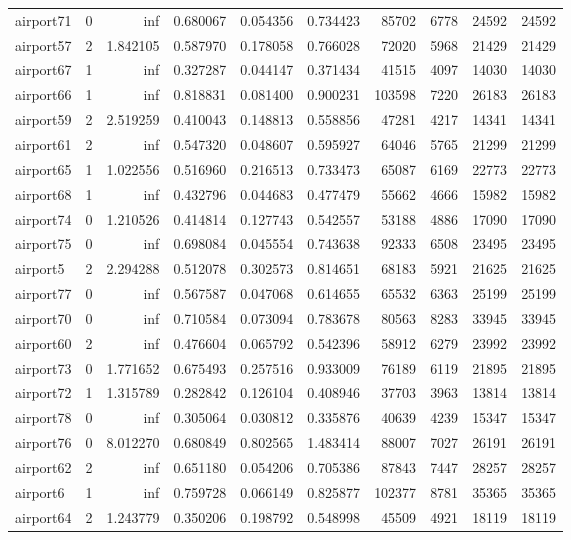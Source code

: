 \begin{longtable}{|l|r|r|r|r|r|r|r|r|r|}
airport71 & 0 & inf & 0.680067 & 0.054356 & 0.734423 & 85702 & 6778 & 24592 & 24592 \\
airport57 & 2 & 1.842105 & 0.587970 & 0.178058 & 0.766028 & 72020 & 5968 & 21429 & 21429 \\
airport67 & 1 & inf & 0.327287 & 0.044147 & 0.371434 & 41515 & 4097 & 14030 & 14030 \\
airport66 & 1 & inf & 0.818831 & 0.081400 & 0.900231 & 103598 & 7220 & 26183 & 26183 \\
airport59 & 2 & 2.519259 & 0.410043 & 0.148813 & 0.558856 & 47281 & 4217 & 14341 & 14341 \\
airport61 & 2 & inf & 0.547320 & 0.048607 & 0.595927 & 64046 & 5765 & 21299 & 21299 \\
airport65 & 1 & 1.022556 & 0.516960 & 0.216513 & 0.733473 & 65087 & 6169 & 22773 & 22773 \\
airport68 & 1 & inf & 0.432796 & 0.044683 & 0.477479 & 55662 & 4666 & 15982 & 15982 \\
airport74 & 0 & 1.210526 & 0.414814 & 0.127743 & 0.542557 & 53188 & 4886 & 17090 & 17090 \\
airport75 & 0 & inf & 0.698084 & 0.045554 & 0.743638 & 92333 & 6508 & 23495 & 23495 \\
airport5 & 2 & 2.294288 & 0.512078 & 0.302573 & 0.814651 & 68183 & 5921 & 21625 & 21625 \\
airport77 & 0 & inf & 0.567587 & 0.047068 & 0.614655 & 65532 & 6363 & 25199 & 25199 \\
airport70 & 0 & inf & 0.710584 & 0.073094 & 0.783678 & 80563 & 8283 & 33945 & 33945 \\
airport60 & 2 & inf & 0.476604 & 0.065792 & 0.542396 & 58912 & 6279 & 23992 & 23992 \\
airport73 & 0 & 1.771652 & 0.675493 & 0.257516 & 0.933009 & 76189 & 6119 & 21895 & 21895 \\
airport72 & 1 & 1.315789 & 0.282842 & 0.126104 & 0.408946 & 37703 & 3963 & 13814 & 13814 \\
airport78 & 0 & inf & 0.305064 & 0.030812 & 0.335876 & 40639 & 4239 & 15347 & 15347 \\
airport76 & 0 & 8.012270 & 0.680849 & 0.802565 & 1.483414 & 88007 & 7027 & 26191 & 26191 \\
airport62 & 2 & inf & 0.651180 & 0.054206 & 0.705386 & 87843 & 7447 & 28257 & 28257 \\
airport6 & 1 & inf & 0.759728 & 0.066149 & 0.825877 & 102377 & 8781 & 35365 & 35365 \\
airport64 & 2 & 1.243779 & 0.350206 & 0.198792 & 0.548998 & 45509 & 4921 & 18119 & 18119 \\

\end{longtable}
